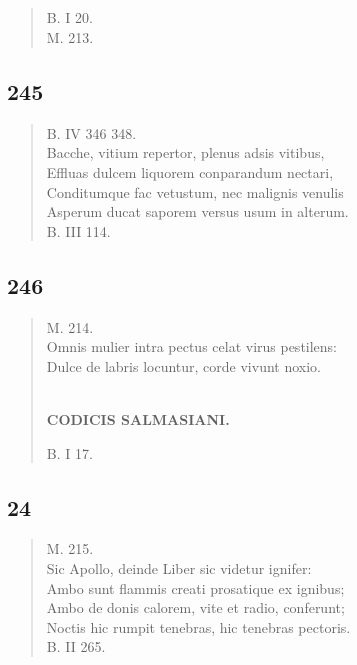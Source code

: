 \documentclass[11pt, a4paper]{report}
\begin{document}
            \subsection*{}
      \begin{verse}
      \end{verse}
  
            \subsection*{}
      \begin{verse}
      B. I 20. \\ M. 213. \\ 
      \end{verse}
  
            \subsection*{245}
      \begin{verse}
      B. IV 346 348. \\ Bacche, vitium repertor, plenus adsis vitibus, \\ Effluas dulcem liquorem conparandum nectari, \\ Conditumque fac vetustum, nec malignis venulis \\ Asperum ducat saporem versus usum in alterum. \\ B. III 114. \\ 
      \end{verse}
  
            \subsection*{246}
      \begin{verse}
      M. 214. \\ Omnis mulier intra pectus celat virus pestilens: \\ Dulce de labris locuntur, corde vivunt noxio. \\ 
        ﻿\pagebreak 
    \begin{center} \textbf{CODICIS SALMASIANI.} \end{center} \marginpar{[201]} B. I 17. \\ 
      \end{verse}
  
            \subsection*{24}
      \begin{verse}
      M. 215. \\ Sic Apollo, deinde Liber sic videtur ignifer: \\ Ambo sunt flammis creati prosatique ex ignibus; \\ Ambo de donis calorem, vite et radio, conferunt; \\ Noctis hic rumpit tenebras, hic tenebras pectoris. \\ B. II 265. \\ 
      \end{verse}
  
\end{document}
